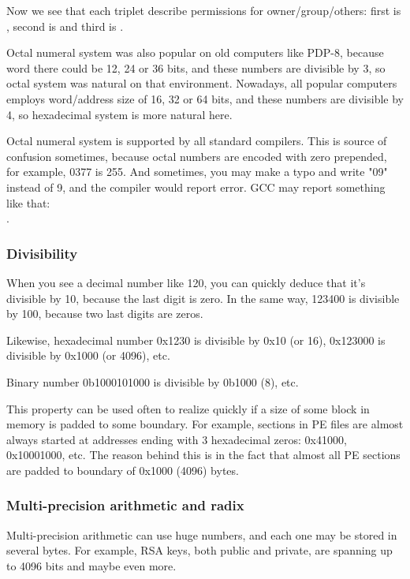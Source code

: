 Now we see that each triplet describe permissions for owner/group/others: first is , second is  and third is .

Octal numeral system was also popular on old computers like PDP-8, because word there could be 12, 24 or 36 bits, and these numbers are divisible by 3, so octal system was natural on that environment.
Nowadays, all popular computers employs word/address size of 16, 32 or 64 bits, and these numbers are divisible by 4, so hexadecimal system is more natural here.

Octal numeral system is supported by all standard \CCpp compilers.
This is source of confusion sometimes, because octal numbers are encoded with zero prepended, for example, 0377 is 255.
And sometimes, you may make a typo and write "09" instead of 9, and the compiler would report error.
GCC may report something like that:\\
.

\subsubsection{Divisibility}

When you see a decimal number like 120, you can quickly deduce that it's divisible by 10, because the last digit is zero.
In the same way, 123400 is divisible by 100, because two last digits are zeros.

Likewise, hexadecimal number 0x1230 is divisible by 0x10 (or 16), 0x123000 is divisible by 0x1000 (or 4096), etc.

Binary number 0b1000101000 is divisible by 0b1000 (8), etc.

This property can be used often to realize quickly if a size of some block in memory is padded to some boundary.
For example, sections in \ac{PE} files are almost always started at addresses ending with 3 hexadecimal zeros: 0x41000, 0x10001000, etc.
The reason behind this is in the fact that almost all \ac{PE} sections are padded to boundary of 0x1000 (4096) bytes.

\subsubsection{Multi-precision arithmetic and radix}

Multi-precision arithmetic can use huge numbers, and each one may be stored in several bytes.
For example, RSA keys, both public and private, are spanning up to 4096 bits and maybe even more.

